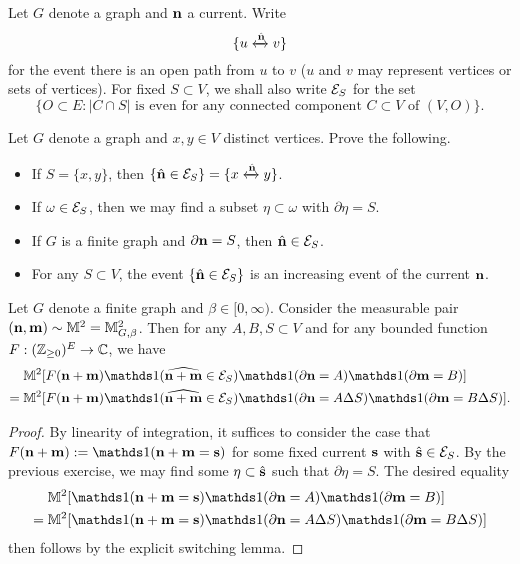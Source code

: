 \begin{definition}
    Let $G$ denote a graph and $\mathbf{n}$ a current.
    Write \[\{u\xleftrightarrow{\hat{\mathbf{n}}}v\}\]
    for the event there is an open path from $u$ to $v$
    ($u$ and $v$ may represent vertices or sets of vertices).
    For fixed $S\subset V$, we shall also write $\mathcal E_S$ for the set
    \[
        \{O\subset E:\text{$|C\cap S|$ is even for any connected component $C\subset V$ of $(V,O)$}\}.
    \]
\end{definition}

\begin{exercise}
    Let $G$ denote a graph and 
    $x,y\in V$  distinct vertices. Prove the following.
    \begin{itemize}
        \item If $S=\{x,y\}$, then $\{\hat{\mathbf{n}}\in\mathcal E_S\}=\{x\xleftrightarrow{\hat{\mathbf{n}}}y\}$.
        \item If $\omega\in\mathcal E_S$, then we may find a subset $\eta\subset\omega$ with $\partial\eta=S$.
        \item If $G$ is a finite graph and $\partial\mathbf{n}=S$, then $\hat{\mathbf{n}}\in\mathcal E_S$.
        \item For any $S\subset V$, the event $\{\hat{\mathbf{n}}\in\mathcal E_S\}$ is an increasing event of the current $\mathbf{n}$.
    \end{itemize}
\end{exercise}

\begin{lemma}
    \label{lem:switching_lemma}
    Let $G$ denote a finite graph and $\beta\in[0,\infty)$.
    Consider the measurable pair $(\mathbf{n},\mathbf{m})\sim \mathbb M^2=\mathbb M_{G,\beta}^2$.
    Then for any $A,B,S\subset V$ and for any bounded function $F:(\mathbb Z_{\geq 0})^E\to\mathbb C$,
    we have
    \begin{align}
        &\M^2[F(\n+\m)\true{\widehat{\n+\m} \in \calE_S}\true{\partial\n=A}\true{\partial\m=B}]
        \\={}&
        \M^2[F(\n+\m)\true{\widehat{\n+\m} \in \calE_S}\true{\partial\n=A\Delta S}\true{\partial\m=B\Delta S}].
    \end{align}
\end{lemma}

\begin{proof}
    By linearity of integration, it suffices to consider the case that $F(\n+\m):=\true{\n+\m=\s}$
    for some fixed current $\mathbf{s}$ with $\hat{\mathbf{s}}\in\mathcal E_S$.
    By the previous exercise, we may find some $\eta\subset\hat{\mathbf{s}}$
    such that $\partial\eta=S$.
    The desired equality
    \begin{align}
    &
    \M^2[\true{\n+\m =\s}\true{\partial\n=A}\true{\partial\m=B}]
    \\={}&
    \M^2[\true{\n+\m =\s}\true{\partial\n=A\Delta S}\true{\partial\m=B\Delta S}]
    \end{align}
    then follows by the explicit switching lemma.
\end{proof}

